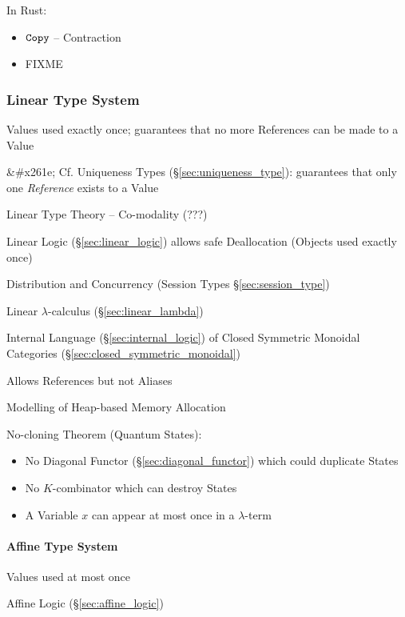 In Rust:

\begin{itemize}
  \item $\mathtt{Copy}$ -- Contraction
  \item FIXME
\end{itemize}



\subsubsection{Linear Type System}\label{sec:linear_type}

Values used exactly once; guarantees that no more References can be
made to a Value

&#x261e; Cf. Uniqueness Types (\S\ref{sec:uniqueness_type}):
guarantees that only one \emph{Reference} exists to a Value

Linear Type Theory -- Co-modality (???) %

Linear Logic (\S\ref{sec:linear_logic}) allows safe Deallocation
(Objects used exactly once)

Distribution and Concurrency (Session Types \S\ref{sec:session_type})

Linear $\lambda$-calculus (\S\ref{sec:linear_lambda})

Internal Language (\S\ref{sec:internal_logic}) of Closed Symmetric
Monoidal Categories (\S\ref{sec:closed_symmetric_monoidal})

Allows References but not Aliases

Modelling of Heap-based Memory Allocation

No-cloning Theorem (Quantum States):
\begin{itemize}
  \item No Diagonal Functor (\S\ref{sec:diagonal_functor})
    which could duplicate States
  \item No $K$-combinator which can destroy States
  \item A Variable $x$ can appear at most once in a $\lambda$-term
\end{itemize}



\paragraph{Affine Type System}\label{sec:affine_type}\hfill

Values used at most once

Affine Logic (\S\ref{sec:affine_logic})



